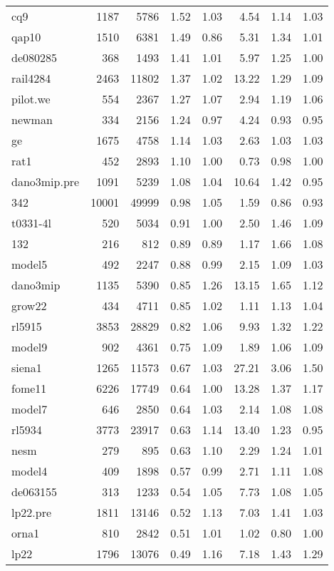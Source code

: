 \documentclass[10pt]{article}
\begin{document}
\begin{longtable}{|l|r|r|r|r|r|r|r|}
cq9	&	1187	&	5786	&	1.52	&	1.03	&	4.54	&	1.14	&	1.03	\\
qap10	&	1510	&	6381	&	1.49	&	0.86	&	5.31	&	1.34	&	1.01	\\
de080285	&	368	&	1493	&	1.41	&	1.01	&	5.97	&	1.25	&	1.00	\\
rail4284	&	2463	&	11802	&	1.37	&	1.02	&	13.22	&	1.29	&	1.09	\\
pilot.we	&	554	&	2367	&	1.27	&	1.07	&	2.94	&	1.19	&	1.06	\\
newman	&	334	&	2156	&	1.24	&	0.97	&	4.24	&	0.93	&	0.95	\\
ge	&	1675	&	4758	&	1.14	&	1.03	&	2.63	&	1.03	&	1.03	\\
rat1	&	452	&	2893	&	1.10	&	1.00	&	0.73	&	0.98	&	1.00	\\
dano3mip.pre	&	1091	&	5239	&	1.08	&	1.04	&	10.64	&	1.42	&	0.95	\\
342	&	10001	&	49999	&	0.98	&	1.05	&	1.59	&	0.86	&	0.93	\\
t0331-4l	&	520	&	5034	&	0.91	&	1.00	&	2.50	&	1.46	&	1.09	\\
132	&	216	&	812	&	0.89	&	0.89	&	1.17	&	1.66	&	1.08	\\
model5	&	492	&	2247	&	0.88	&	0.99	&	2.15	&	1.09	&	1.03	\\
dano3mip	&	1135	&	5390	&	0.85	&	1.26	&	13.15	&	1.65	&	1.12	\\
grow22	&	434	&	4711	&	0.85	&	1.02	&	1.11	&	1.13	&	1.04	\\
rl5915	&	3853	&	28829	&	0.82	&	1.06	&	9.93	&	1.32	&	1.22	\\
model9	&	902	&	4361	&	0.75	&	1.09	&	1.89	&	1.06	&	1.09	\\
siena1	&	1265	&	11573	&	0.67	&	1.03	&	27.21	&	3.06	&	1.50	\\
fome11	&	6226	&	17749	&	0.64	&	1.00	&	13.28	&	1.37	&	1.17	\\
model7	&	646	&	2850	&	0.64	&	1.03	&	2.14	&	1.08	&	1.08	\\
rl5934	&	3773	&	23917	&	0.63	&	1.14	&	13.40	&	1.23	&	0.95	\\
nesm	&	279	&	895	&	0.63	&	1.10	&	2.29	&	1.24	&	1.01	\\
model4	&	409	&	1898	&	0.57	&	0.99	&	2.71	&	1.11	&	1.08	\\
de063155	&	313	&	1233	&	0.54	&	1.05	&	7.73	&	1.08	&	1.05	\\
lp22.pre	&	1811	&	13146	&	0.52	&	1.13	&	7.03	&	1.41	&	1.03	\\
orna1	&	810	&	2842	&	0.51	&	1.01	&	1.02	&	0.80	&	1.00	\\
lp22	&	1796	&	13076	&	0.49	&	1.16	&	7.18	&	1.43	&	1.29	\\

\end{longtable}
\end{document}
